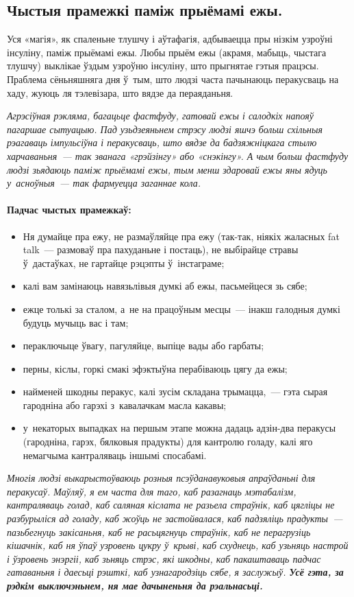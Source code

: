 \subsection*{Чыстыя прамежкі паміж прыёмамі ежы.}
Уся «магія», як спаленьне тлушчу і аўтафагія, адбываецца пры нізкім узроўні інсуліну, паміж прыёмамі ежы. Любы прыём ежы (акрамя, мабыць, чыстага тлушчу) выклікае ўздым узроўню інсуліну, што прыгнятае гэтыя працэсы. Праблема сёньняшняга дня ў~тым, што людзі часта пачынаюць перакусваць на хаду, жуюць ля тэлевізара, што вядзе да пераяданьня.

\emph{Агрэсіўная рэкляма, багацьце фастфуду, гатовай ежы і салодкіх напояў пагаршае сытуацыю. Пад узьдзеяньнем стрэсу людзі яшчэ больш схільныя рэагаваць імпульсіўна і перакусваць, што вядзе да бадзяжніцкага стылю харчаваньня~--- так званага «грэйзінгу» або «снэкінгу». А чым больш фастфуду людзі зьядаюць паміж прыёмамі ежы, тым менш здаровай ежы яны ядуць у~асноўныя~--- так фармуецца заганнае кола.}

\paragraph{Падчас чыстых прамежкаў:}
\begin{itemize}
  \item Ня думайце пра ежу, не размаўляйце пра ежу (так-так, ніякіх жаласных fat talk~--- размоваў пра пахуданьне і постаць), не выбірайце стравы ў~дастаўках, не гартайце рэцэпты ў~інстаграме;
  \item калі вам замінаюць навязьлівыя думкі аб ежы, пасьмейцеся зь сябе;
  \item ежце толькі за сталом, а~не на працоўным месцы~--- інакш галодныя думкі будуць мучыць вас і там;
  \item пераключыце ўвагу, пагуляйце, выпіце вады або гарбаты;
  \item перны, кіслы, горкі смакі эфэктыўна перабіваюць цягу да ежы;
  \item найменей шкодны перакус, калі зусім складана трымацца,~--- гэта сырая гародніна або гарэхі з~кавалачкам масла какавы;
  \item у~некаторых выпадках на першым этапе можна дадаць адзін-два перакусы (гародніна, гарэх, бялковыя прадукты) для кантролю голаду, калі яго немагчыма кантраляваць іншымі спосабамі.
\end{itemize}

\emph{Многія людзі выкарыстоўваюць розныя псэўданавуковыя апраўданьні для перакусаў. Маўляў, я ем часта для таго, каб разагнаць мэтабалізм, кантраляваць голад, каб саляная кіслата не разьела страўнік, каб цягліцы не разбурыліся ад голаду, каб жоўць не застойвалася, каб падзяліць прадукты~--- пазьбегнуць закісаньня, каб не расьцягнуць страўнік, каб не перагрузіць кішачнік, каб ня ўпаў узровень цукру ў~крыві, каб схуднець, каб узьняць настрой і ўзровень энэргіі, каб зьняць стрэс, які шкодны, каб пакаштаваць падчас гатаваньня і даесьці рэшткі, каб узнагародзіць сябе, я заслужыў. \textbf{Усё гэта, за рэдкім выключэньнем, ня мае дачыненьня да рэальнасьці.}}


